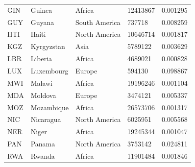\documentclass[11pt]{report}
\begin{document}
\begin{table}[]
\begin{tabular}{lllll}
            GIN                           & Guinea                    & Africa                         & 12413867                      & 0.001295                           \\
            GUY                           & Guyana                    & South America                  & 737718                        & 0.008259                           \\
            HTI                           & Haiti                     & North America                  & 10646714                      & 0.001817                           \\
            KGZ                           & Kyrgyzstan                & Asia                           & 5789122                       & 0.003629                           \\
            LBR                           & Liberia                   & Africa                         & 4689021                       & 0.000828                           \\
            LUX                           & Luxembourg                & Europe                         & 594130                        & 0.098867                           \\
            MWI                           & Malawi                    & Africa                         & 19196246                      & 0.001104                           \\
            MDA                           & Moldova                   & Europe                         & 3474121                       & 0.005337                           \\
            MOZ                           & Mozambique                & Africa                         & 26573706                      & 0.001317                           \\
            NIC                           & Nicaragua                 & North America                  & 6025951                       & 0.005568                           \\
            NER                           & Niger                     & Africa                         & 19245344                      & 0.001047                           \\
            PAN                           & Panama                    & North America                  & 3753142                       & 0.024811                           \\
            RWA                           & Rwanda                    & Africa                         & 11901484                      & 0.001846                           \\

\end{tabular}
\end{table}
\end{document}
